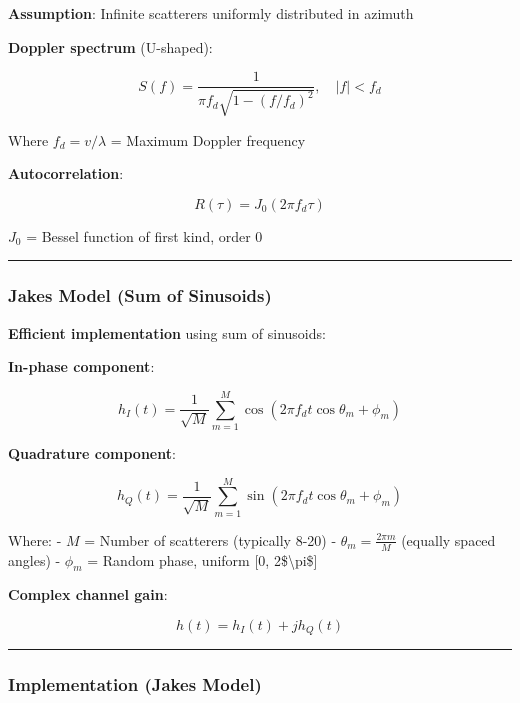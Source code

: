 \textbf{Assumption}: Infinite scatterers uniformly distributed in
azimuth

\textbf{Doppler spectrum} (U-shaped):

\[
S(f) = \frac{1}{\pi f_d \sqrt{1 - (f/f_d)^2}}, \quad |f| < f_d
\]

Where \(f_d = v/\lambda\) = Maximum Doppler frequency

\textbf{Autocorrelation}:

\[
R(\tau) = J_0(2\pi f_d \tau)
\]

\(J_0\) = Bessel function of first kind, order 0

\begin{center}\rule{0.5\linewidth}{0.5pt}\end{center}

\subsubsection{Jakes\textquotesingle{} Model (Sum of
Sinusoids)}\label{jakes-model-sum-of-sinusoids}

\textbf{Efficient implementation} using sum of sinusoids:

\textbf{In-phase component}:

\[
h_I(t) = \frac{1}{\sqrt{M}} \sum_{m=1}^{M} \cos(2\pi f_d t \cos\theta_m + \phi_m)
\]

\textbf{Quadrature component}:

\[
h_Q(t) = \frac{1}{\sqrt{M}} \sum_{m=1}^{M} \sin(2\pi f_d t \cos\theta_m + \phi_m)
\]

Where: - \(M\) = Number of scatterers (typically 8-20) -
\(\theta_m = \frac{2\pi m}{M}\) (equally spaced angles) - \(\phi_m\) =
Random phase, uniform {[}0, 2\$\textbackslash pi\${]}

\textbf{Complex channel gain}:

\[
h(t) = h_I(t) + j h_Q(t)
\]

\begin{center}\rule{0.5\linewidth}{0.5pt}\end{center}

\subsubsection{Implementation (Jakes\textquotesingle{}
Model)}\label{implementation-jakes-model}

